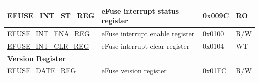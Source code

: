\begin{longtable}{ | p{6cm} | p{7.2cm} | p{1.3cm} | p{1.5cm} | }
\hyperref[regdesc:EFUSEINTSTREG]{EFUSE\_INT\_ST\_REG} & eFuse interrupt status register & 0x009C & RO \\ \hline
\hyperref[regdesc:EFUSEINTENAREG]{EFUSE\_INT\_ENA\_REG} & eFuse interrupt enable register & 0x0100 & R/W \\ \hline
\hyperref[regdesc:EFUSEINTCLRREG]{EFUSE\_INT\_CLR\_REG} & eFuse interrupt clear register & 0x0104 & WT \\ \hline
\multicolumn{4}{|l|}{\textbf{Version Register}} \\ \hline
\hyperref[regdesc:EFUSEDATEREG]{EFUSE\_DATE\_REG} & eFuse version register & 0x01FC & R/W \\ \hline
\end{longtable}
